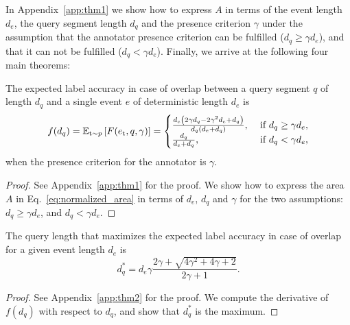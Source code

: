 In Appendix~\ref{app:thm1} we show how to express $A$ in terms of the event length $d_e$, the query segment length $d_q$ and the presence criterion $\gamma$ under the assumption that the annotator presence criterion can be fulfilled ($d_q \geq \gamma d_e$), and that it can not be fulfilled ($d_q < \gamma d_e$). Finally, we arrive at the following four main theorems:

\begin{theorem}
\label{thm:expected_iou}
The expected label accuracy in case of overlap between a query segment $q$ of length $d_q$ and a single event $e$ of deterministic length $d_e$ is
\begin{equation}
\label{eq:expected_iou}
    f(d_q) = \mathbb{E}_{{\textnormal{t}} \sim p}\left[F(e_{{\textnormal{t}}}, q, \gamma)\right] = \begin{cases}
    \frac{d_{e} \left(2 \gamma d_{q} - 2 \gamma^2 d_{e} + d_{q}\right)}{d_{q} \left(d_{e} + d_{q}\right)}, & \text{ if } d_q \geq \gamma d_e, \\
    \frac{d_q}{d_e + d_q}, & \text{ if } d_q < \gamma d_e,
    \end{cases}
\end{equation}
when the presence criterion for the annotator is $\gamma$.
\end{theorem}
\begin{proof} See Appendix~\ref{app:thm1} for the proof. We show how to express the area $A$ in Eq.~\ref{eq:normalized_area} in terms of $d_e$, $d_q$ and $\gamma$ for the two assumptions: $d_q \geq \gamma d_e$, and $d_q < \gamma d_e$.
\end{proof}


\begin{theorem}
\label{thm:fix_optimal_query_length}
The query length that maximizes the expected label accuracy in case of overlap for a given event length $d_e$ is 
\begin{equation}
\label{eq:fix_optimal_query_length}
    d_q^* = d_e\gamma\frac{2\gamma + \sqrt{4\gamma^2 + 4\gamma + 2}}{2\gamma + 1}.
\end{equation}
\end{theorem}
\begin{proof}
See Appendix~\ref{app:thm2} for the proof. We compute the derivative of $f(d_q)$ with respect to $d_q$, and show that $d_q^*$ is the maximum.
\end{proof}

